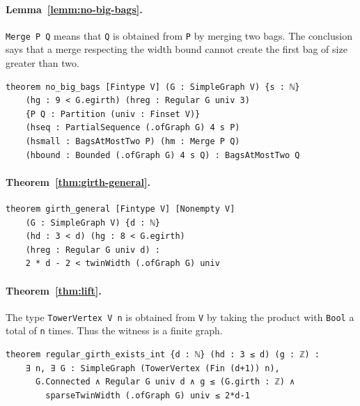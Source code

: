 \par\medskip
\noindent\begin{minipage}{\linewidth}
\paragraph*{Lemma~\ref{lemm:no-big-bags}.}
\lstinline|Merge P Q| means that \lstinline|Q| is obtained from
\lstinline|P| by merging two bags. The conclusion says that a merge
respecting the width bound cannot create the first bag of size greater
than two.
\begin{lstlisting}
theorem no_big_bags [Fintype V] (G : SimpleGraph V) {s : ℕ}
    (hg : 9 < G.egirth) (hreg : Regular G univ 3)
    {P Q : Partition (univ : Finset V)}
    (hseq : PartialSequence (.ofGraph G) 4 s P)
    (hsmall : BagsAtMostTwo P) (hm : Merge P Q)
    (hbound : Bounded (.ofGraph G) 4 s Q) : BagsAtMostTwo Q
\end{lstlisting}
\end{minipage}
\par\medskip
\noindent\begin{minipage}{\linewidth}
\paragraph*{Theorem~\ref{thm:girth-general}.}
\begin{lstlisting}
theorem girth_general [Fintype V] [Nonempty V]
    (G : SimpleGraph V) {d : ℕ}
    (hd : 3 < d) (hg : 8 < G.egirth)
    (hreg : Regular G univ d) :
    2 * d - 2 < twinWidth (.ofGraph G) univ
\end{lstlisting}
\end{minipage}
\par\medskip
\noindent\begin{minipage}{\linewidth}
\paragraph*{Theorem~\ref{thm:lift}.}
The type \lstinline|TowerVertex V n| is obtained from \lstinline|V|
by taking the product with \lstinline|Bool| a total of \lstinline|n|
times. Thus the witness is a finite graph.
\begin{lstlisting}
theorem regular_girth_exists_int {d : ℕ} (hd : 3 ≤ d) (g : ℤ) :
    ∃ n, ∃ G : SimpleGraph (TowerVertex (Fin (d+1)) n),
      G.Connected ∧ Regular G univ d ∧ g ≤ (G.girth : ℤ) ∧
        sparseTwinWidth (.ofGraph G) univ ≤ 2*d-1
\end{lstlisting}
\end{minipage}
